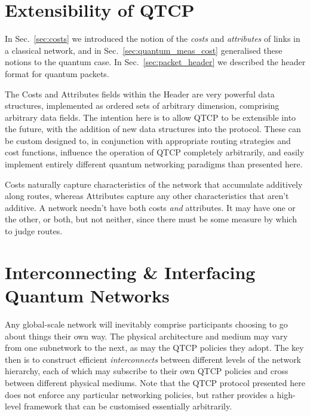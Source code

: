 \documentclass[aps,rmp,twocolumn,amsmath,amssymb,nofootinbib,superscriptaddress]{revtex4}
\begin{document}
%
%

\section{Extensibility of QTCP} \label{sec:c_vs_a}

In Sec.~\ref{sec:costs} we introduced the notion of the \emph{costs} and \emph{attributes} of links in a classical network, and in Sec.~\ref{sec:quantum_meas_cost} generalised these notions to the quantum case. In Sec.~\ref{sec:packet_header} we described the header format for quantum packets.

The {\sc Costs} and {\sc Attributes} fields within the {\sc Header} are very powerful data structures, implemented as ordered sets of arbitrary dimension, comprising arbitrary data fields. The intention here is to allow QTCP to be extensible into the future, with the addition of new data structures into the protocol. These can be custom designed to, in conjunction with appropriate routing strategies and cost functions, influence the operation of QTCP completely arbitrarily, and easily implement entirely different quantum networking paradigms than presented here.

{\sc Costs} naturally capture characteristics of the network that accumulate additively along routes, whereas {\sc Attributes} capture any other characteristics that aren't additive. A network needn't have both costs \emph{and} attributes. It may have one or the other, or both, but not neither, since there must be some measure by which to judge routes.

%
%

\section{Interconnecting \& Interfacing Quantum Networks} \label{sec:inter}

Any global-scale network will inevitably comprise participants choosing to go about things their own way. The physical architecture and medium may vary from one subnetwork to the next, as may the QTCP policies they adopt. The key then is to construct efficient \emph{interconnects} between different levels of the network hierarchy, each of which may subscribe to their own QTCP policies and cross between different physical mediums. Note that the QTCP protocol presented here does not enforce any particular networking policies, but rather provides a high-level framework that can be customised essentially arbitrarily.
\end{document}
